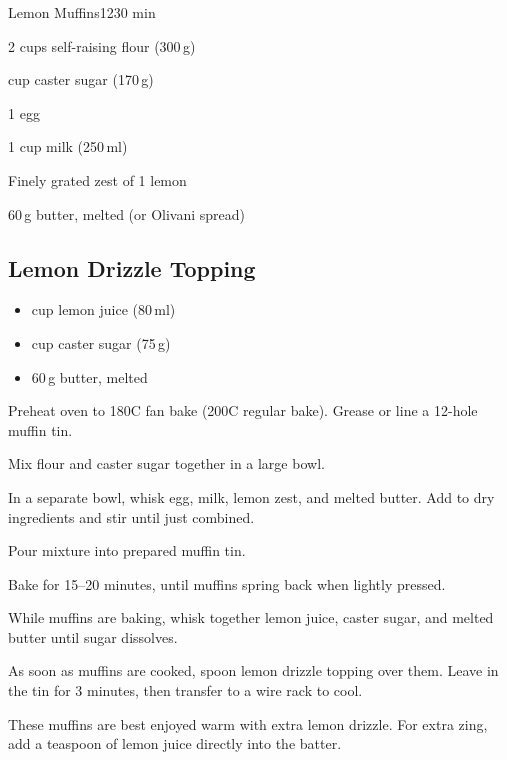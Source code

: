 \begin{recipebox}{Lemon Muffins}{12}{30 min}
\begin{ingredients}
  \item 2 cups self-raising flour (300\,g)
  \item {} cup caster sugar (170\,g)
  \item 1 egg
  \item 1 cup milk (250\,ml)
  \item Finely grated zest of 1 lemon
  \item 60\,g butter, melted (or Olivani spread)
\end{ingredients}

\subsection*{Lemon Drizzle Topping}
\begin{itemize}[leftmargin=2em]
  \item {} cup lemon juice (80\,ml)
  \item {} cup caster sugar (75\,g)
  \item 60\,g butter, melted
\end{itemize}

\begin{method}
  \item Preheat oven to 180\degree C fan bake (200\degree C regular bake). Grease or line a 12-hole muffin tin.
  \item Mix flour and caster sugar together in a large bowl.
  \item In a separate bowl, whisk egg, milk, lemon zest, and melted butter. Add to dry ingredients and stir until just combined.
  \item Pour mixture into prepared muffin tin.
  \item Bake for 15–20 minutes, until muffins spring back when lightly pressed.
  \item While muffins are baking, whisk together lemon juice, caster sugar, and melted butter until sugar dissolves.
  \item As soon as muffins are cooked, spoon lemon drizzle topping over them. Leave in the tin for 3 minutes, then transfer to a wire rack to cool.
\end{method}

\begin{notes}
These muffins are best enjoyed warm with extra lemon drizzle.  
For extra zing, add a teaspoon of lemon juice directly into the batter.  
\end{notes}
\end{recipebox}
